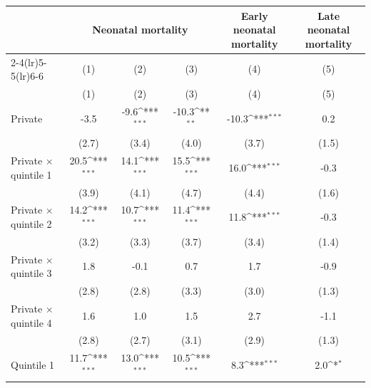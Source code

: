 {
\def\sym#1{\ifmmode^{#1}\else\(^{#1}\)\fi}
\begin{tabular}{l*{5}{c}}
\toprule
            &\multicolumn{3}{c}{Neonatal mortality}                           &\multicolumn{1}{c}{Early neonatal mortality}&\multicolumn{1}{c}{Late neonatal mortality}\\\cmidrule(lr){2-4}\cmidrule(lr){5-5}\cmidrule(lr){6-6}
            &\multicolumn{1}{c}{(1)}&\multicolumn{1}{c}{(2)}&\multicolumn{1}{c}{(3)}&\multicolumn{1}{c}{(4)}&\multicolumn{1}{c}{(5)}\\
            &\multicolumn{1}{c}{(1)}&\multicolumn{1}{c}{(2)}&\multicolumn{1}{c}{(3)}&\multicolumn{1}{c}{(4)}&\multicolumn{1}{c}{(5)}\\
\midrule
Private     &        -3.5         &        -9.6\sym{***}&       -10.3\sym{**} &       -10.3\sym{***}&         0.2         \\
            &       (2.7)         &       (3.4)         &       (4.0)         &       (3.7)         &       (1.5)         \\
\addlinespace
Private $\times$ quintile 1&        20.5\sym{***}&        14.1\sym{***}&        15.5\sym{***}&        16.0\sym{***}&        -0.3         \\
            &       (3.9)         &       (4.1)         &       (4.7)         &       (4.4)         &       (1.6)         \\
\addlinespace
Private $\times$ quintile 2&        14.2\sym{***}&        10.7\sym{***}&        11.4\sym{***}&        11.8\sym{***}&        -0.3         \\
            &       (3.2)         &       (3.3)         &       (3.7)         &       (3.4)         &       (1.4)         \\
\addlinespace
Private $\times$ quintile 3&         1.8         &        -0.1         &         0.7         &         1.7         &        -0.9         \\
            &       (2.8)         &       (2.8)         &       (3.3)         &       (3.0)         &       (1.3)         \\
\addlinespace
Private $\times$ quintile 4&         1.6         &         1.0         &         1.5         &         2.7         &        -1.1         \\
            &       (2.8)         &       (2.7)         &       (3.1)         &       (2.9)         &       (1.3)         \\
\addlinespace
Quintile 1  &        11.7\sym{***}&        13.0\sym{***}&        10.5\sym{***}&         8.3\sym{***}&         2.0\sym{*}  \\

\end{tabular}}
